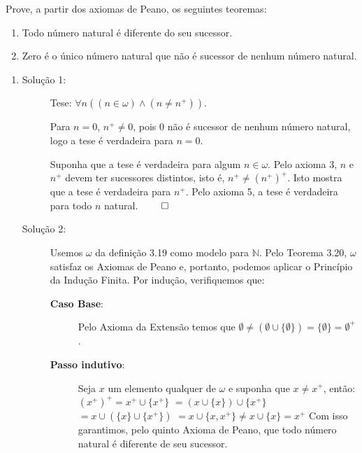 \begin{exercicio}
	Prove, a partir dos axiomas de Peano, os seguintes teoremas:
	\begin{enumerate}[label=(\alph{*})]
		\item Todo número natural é diferente do seu sucessor.
		\item Zero é o único número natural que não é sucessor de nenhum número natural.
	\end{enumerate}
\end{exercicio}

\begin{enumerate}[label=(\alph{*})]
	\item 
		\begin{description}
			\item[Solução 1:] Tese: $\forall n((n\in\omega)\wedge(n\neq n^+))$.
	
			Para $n=0$, $n^+\neq0$, pois $0$ não é sucessor de nenhum número natural, logo a tese é verdadeira para $n=0$.
			
			Suponha que a tese é verdadeira para algum $n\in\omega$. Pelo axioma 3, $n$ e $n^+$ devem ter sucessores distintos, isto é, $n^+\neq(n^+)^+$. Isto mostra que a tese é verdadeira para $n^+$. Pelo axioma 5, a tese é verdadeira para todo $n$ natural. $\qed$
			\item[Solução 2:] Usemos $\omega$ da definição 3.19 como modelo para $\mathbb{N}$. Pelo Teorema 3.20, $\omega$ satisfaz os Axiomas de Peano e, portanto, podemos aplicar o Princípio da Indução Finita. Por indução, verifiquemos que:
				\begin{description}
					\item[\textbf{Caso Base}:] Pelo Axioma da Extensão temos que $\emptyset \neq (\emptyset \cup \{\emptyset\}) = \{\emptyset\} = \emptyset^+$.
					\item[\textbf{Passo indutivo}:] Seja $x$ um elemento qualquer de $\omega$ e suponha que $x \neq x^+$, então: \newline \newline $(x^+)^+ = x^+ \cup \{x^+\}$ \newline $=  (x \cup \{x\}) \cup \{x^+\}$ \newline $= x \cup (\{x\} \cup \{x^+\})$ \newline $= x \cup \{x, x^+\} \neq x \cup \{x\} = x^+$ \newline \newline Com isso garantimos, pelo quinto Axioma de Peano, que todo número natural é diferente de seu sucessor. \cqd
				\end{description}
		\end{description}
	

\end{enumerate}
